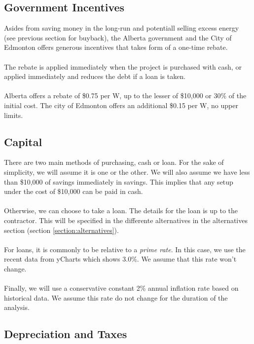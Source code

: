 \documentclass[10pt,letterpaper]{article}
\begin{document}
\subsection{Government Incentives}

Asides from saving money in the long-run and potentiall selling excess energy (see previous section for buyback), the Alberta government and the City of Edmonton offers generous incentives that takes form of a one-time rebate.\cite{kuby-costs,kuby-edmonton,kuby-alberta}\\
\\
The rebate is applied immediately when the project is purchased with cash, or applied immediately and reduces the debt if a loan is taken.\\
\\
Alberta offers a rebate of \$0.75 per W, up to the lesser of \$10,000 or 30\% of the initial cost\cite{kuby-alberta}. The city of Edmonton offers an additional \$0.15 per W, no upper limits.\\

\subsection{Capital}

There are two main methods of purchasing, cash or loan. For the sake of simplicity, we will assume it is one or the other. We will also assume we have less than \$10,000 of savings immediately in savings. This implies that any setup under the cost of \$10,000 can be paid in cash.\\
\\
Otherwise, we can choose to take a loan. The details for the loan is up to the contractor. This will be specified in the differente alternatives in the alternatives section (section \ref{section:alternatives}).\\
\\
For loans, it is commonly to be relative to a \textit{prime rate}. In this case, we use the recent data from yCharts which shows 3.0\%.\cite{prime-rate} We assume that this rate won't change.\\
\\
Finally, we will use a conservative constant 2\% annual inflation rate based on historical data.\cite{inflation} We assume this rate do not change for the duration of the analysis.\\

\subsection{Depreciation and Taxes}
\end{document}
